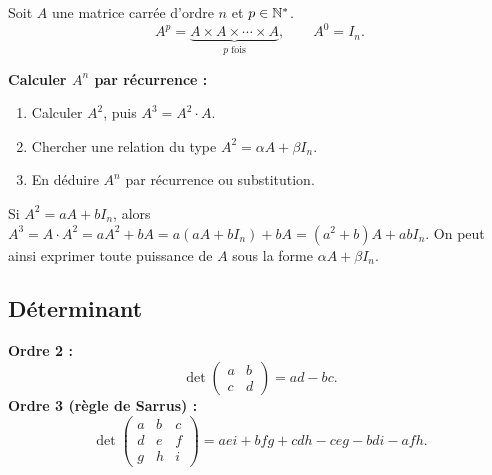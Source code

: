 \begin{definition}
	Soit $A$ une matrice carrée d'ordre $n$ et $p\in\mathbb{N}^*$.
	\[
	A^p = \underbrace{A \times A \times \cdots \times A}_{p \text{ fois}}, \qquad
	A^0 = I_n.
	\]
\end{definition}

\begin{methode}
	\textbf{Calculer $A^n$ par récurrence :}
	\begin{enumerate}
		\item Calculer $A^2$, puis $A^3 = A^2 \cdot A$.
		\item Chercher une relation du type $A^2 = \alpha A + \beta I_n$.
		\item En déduire $A^n$ par récurrence ou substitution.
	\end{enumerate}
\end{methode}

\begin{astucebac}
	Si $A^2 = aA + bI_n$, alors $A^3 = A\cdot A^2 = a A^2 + bA
	= a(aA+bI_n)+bA = (a^2+b)A + abI_n$.
	On peut ainsi exprimer toute puissance de $A$ sous la forme $\alpha A + \beta I_n$.
\end{astucebac}

\subsection{Déterminant}

\begin{definition}
	\textbf{Ordre 2 :}
	\[
	\det\begin{pmatrix}a&b\\c&d\end{pmatrix} = ad - bc.
	\]
	\textbf{Ordre 3 (règle de Sarrus) :}
	\[
	\det\begin{pmatrix}a&b&c\\d&e&f\\g&h&i\end{pmatrix}
	= aei + bfg + cdh - ceg - bdi - afh.
	\]
\end{definition}



